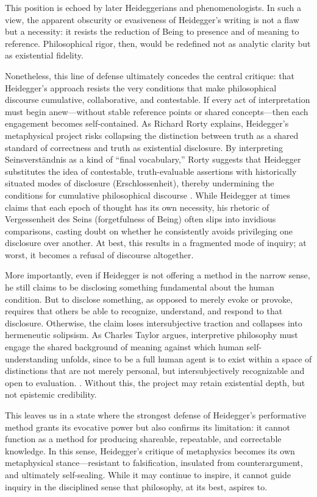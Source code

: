 \documentclass{article}
\begin{document}
This position is echoed by later Heideggerians and phenomenologists. In such a view, the apparent obscurity or evasiveness of Heidegger's writing is not a flaw but a necessity: it resists the reduction of Being to presence and of meaning to reference. Philosophical rigor, then, would be redefined not as analytic clarity but as existential fidelity.

Nonetheless, this line of defense ultimately concedes the central critique: that Heidegger's approach resists the very conditions that make philosophical discourse cumulative, collaborative, and contestable. If every act of interpretation must begin anew—without stable reference points or shared concepts—then each engagement becomes self-contained. As Richard Rorty explains, Heidegger’s metaphysical project risks collapsing the distinction between truth as a shared standard of correctness and truth as existential disclosure. By interpreting Seinsverständnis as a kind of “final vocabulary,” Rorty suggests that Heidegger substitutes the idea of contestable, truth-evaluable assertions with historically situated modes of disclosure (Erschlossenheit), thereby undermining the conditions for cumulative philosophical discourse \parencite[pp.~38-39]{rorty1991}. While Heidegger at times claims that each epoch of thought has its own necessity, his rhetoric of Vergessenheit des Seins (forgetfulness of Being) often slips into invidious comparisons, casting doubt on whether he consistently avoids privileging one disclosure over another. At best, this results in a fragmented mode of inquiry; at worst, it becomes a refusal of discourse altogether.

More importantly, even if Heidegger is not offering a method in the narrow sense, he still claims to be disclosing something fundamental about the human condition. But to disclose something, as opposed to merely evoke or provoke, requires that others be able to recognize, understand, and respond to that disclosure. Otherwise, the claim loses intersubjective traction and collapses into hermeneutic solipsism. As Charles Taylor argues, interpretive philosophy must engage the shared background of meaning against which human self-understanding unfolds, since to be a full human agent is to exist within a space of distinctions that are not merely personal, but intersubjectively recognizable and open to evaluation. \parencite[p.~3]{taylor1985}. Without this, the project may retain existential depth, but not epistemic credibility.

This leaves us in a state where the strongest defense of Heidegger's performative method grants its evocative power but also confirms its limitation: it cannot function as a method for producing shareable, repeatable, and correctable knowledge. In this sense, Heidegger's critique of metaphysics becomes its own metaphysical stance—resistant to falsification, insulated from counterargument, and ultimately self-sealing. While it may continue to inspire, it cannot guide inquiry in the disciplined sense that philosophy, at its best, aspires to.
\end{document}
